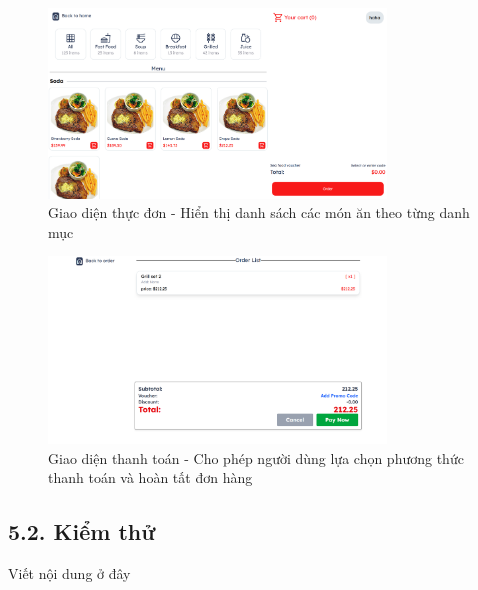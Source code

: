\documentclass[a4paper]{article}
\begin{document}
    \begin{figure}[H]
        \centering
        \includegraphics[width=0.8\textwidth]{menu.png}
        \caption{Giao diện thực đơn - Hiển thị danh sách các món ăn theo từng danh mục}
    \end{figure}
    
    \begin{figure}[H]
        \centering
        \includegraphics[width=0.8\textwidth]{payment.png}
        \caption{Giao diện thanh toán - Cho phép người dùng lựa chọn phương thức thanh toán và hoàn tất đơn hàng}
    \end{figure}

\subsection{5.2. Kiểm thử}
Viết nội dung ở đây

\newpage
\end{document}
